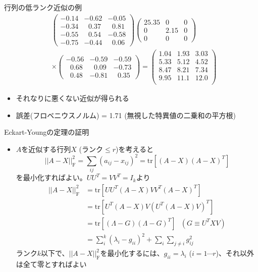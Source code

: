 \documentclass[dvipdfmx]{beamer}
\begin{document}
\begin{frame}[t,fragile]{行列の低ランク近似の例}
  \[
  \begin{split}
    &\begin{pmatrix}
      -0.14 & -0.62 & -0.05 \\
      -0.34 & \ \ \,0.37 & \ \ \,0.81 \\
      -0.55 & \ \ \,0.54 & -0.58 \\
      -0.75 & -0.44 & \ \ \,0.06      
    \end{pmatrix}
    \begin{pmatrix}
      25.35 & 0 & 0 \\
      0 & 2.15 & 0 \\
      0 & 0 & 0
    \end{pmatrix} \\
    & \times
    \begin{pmatrix}
      -0.56 & -0.59 & -0.59 \\
      \ \ \,0.68 & \ \ \,0.09 & -0.73 \\
      \ \ \,0.48 & -0.81 & \ \ \,0.35
    \end{pmatrix}
    = 
    \begin{pmatrix}
      1.04 & 1.93 & 3.03 \\
      5.33 & 5.12 & 4.52 \\
      8.47 & 8.21 & 7.34 \\
      9.95 & 11.1 & 12.0 \\
    \end{pmatrix}
  \end{split}
  \]
  \begin{itemize}
  \item それなりに悪くない近似が得られる
  \item 誤差(フロベニウスノルム) = 1.71 (無視した特異値の二乗和の平方根)
  \end{itemize}
\end{frame}

\begin{frame}[t,fragile]{Eckart-Youngの定理の証明}
  \begin{itemize}
    \setlength{\itemsep}{1em}
  \item $A$を近似する行列$X$ (ランク$\le r$)を考えると
    \[
    ||A-X||_\mathrm{F}^2 = \sum_{ij}(a_{ij}-x_{ij})^2 = \text{tr} [(A-X)(A-X)^T]
    \]
    を最小化すればよい。$UU^T=VV^T = I_k$より
    \[
    \begin{split}
      ||A-X||_\mathrm{F}^2 &= \text{tr} [UU^T(A-X)VV^T(A-X)^T] \\
      &= \text{tr} [U^T(A-X)V (U^T(A-X)V)^T] \\
      &= \text{tr} [(\Lambda-G)(\Lambda-G)^T]  \ \ \ (G \equiv U^TXV)\\
      &= \sum_i^k (\lambda_i - g_{ii})^2 + \sum_i \sum_{j \ne i} g_{ij}^2
    \end{split}
    \]
    ランク$k$以下で、$||A-X||_\mathrm{F}^2$を最小化するには、$g_{ii}=\lambda_i$ ($i=1 \cdots r$)、それ以外は全て零とすればよい
  \end{itemize}
\end{frame}
\end{document}
